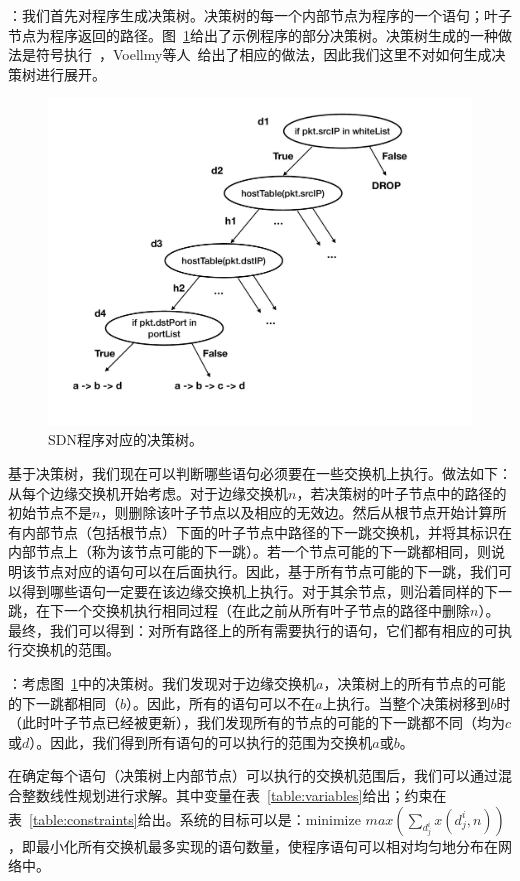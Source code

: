 ：我们首先对程序生成决策树。决策树的每一个内部节点为程序的一个语句；叶子节点为程序返回的路径。图~\ref{fig:dg}给出了示例程序的部分决策树。决策树生成的一种做法是符号执行~\cite{king1976symbolic}，Voellmy等人~\cite{voellmy2016magellan}给出了相应的做法，因此我们这里不对如何生成决策树进行展开。

\begin{figure}[!htbp]
\includegraphics[width=0.8\linewidth]{figures/global-dt.pdf}
\centering
\caption{\small SDN程序对应的决策树。}
\label{fig:dg}
\end{figure}

基于决策树，我们现在可以判断哪些语句必须要在一些交换机上执行。做法如下：从每个边缘交换机开始考虑。对于边缘交换机$n$，若决策树的叶子节点中的路径的初始节点不是$n$，则删除该叶子节点以及相应的无效边。然后从根节点开始计算所有内部节点（包括根节点）下面的叶子节点中路径的下一跳交换机，并将其标识在内部节点上（称为该节点可能的下一跳）。若一个节点可能的下一跳都相同，则说明该节点对应的语句可以在后面执行。因此，基于所有节点可能的下一跳，我们可以得到哪些语句一定要在该边缘交换机上执行。对于其余节点，则沿着同样的下一跳，在下一个交换机执行相同过程（在此之前从所有叶子节点的路径中删除$n$）。最终，我们可以得到：对所有路径上的所有需要执行的语句，它们都有相应的可执行交换机的范围。

：考虑图~\ref{fig:dg}中的决策树。我们发现对于边缘交换机$a$，决策树上的所有节点的可能的下一跳都相同（$b$）。因此，所有的语句可以不在$a$上执行。当整个决策树移到$b$时（此时叶子节点已经被更新），我们发现所有的节点的可能的下一跳都不同（均为$c$或$d$）。因此，我们得到所有语句的可以执行的范围为交换机$a$或$b$。


在确定每个语句（决策树上内部节点）可以执行的交换机范围后，我们可以通过混合整数线性规划进行求解。其中变量在表~\ref{table:variables}给出；约束在表~\ref{table:constraints}给出。系统的目标可以是：minimize $max(\sum_{d_j^i} x(d_j^i, n))$，即最小化所有交换机最多实现的语句数量，使程序语句可以相对均匀地分布在网络中。

